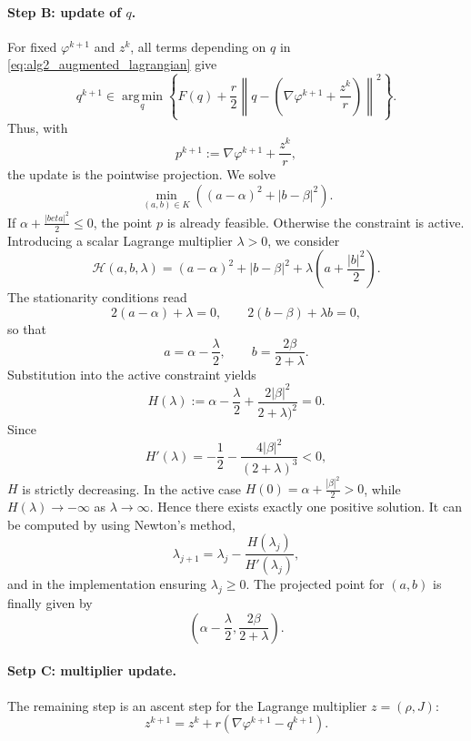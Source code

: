 \paragraph{Step B: update of $q$.}
For fixed $\varphi^{k+1}$ and $z^k$, all terms depending on $q$ in \eqref{eq:alg2_augmented_lagrangian} give
$$
q^{k+1}\in\operatorname*{arg\,\min}_q\left\{F(q)+\frac r2\left\|q-\left(\nabla\varphi^{k+1}+\frac{z^k}{r}\right)\right\|^2\right\}.
$$
Thus, with
$$
p^{k+1}:=\nabla\varphi^{k+1}+\frac{z^k}{r},
$$
the update is the pointwise projection. We solve
\begin{equation*}
	\min_{(a,b)\in K}\left((a-\alpha)^2+|b-\beta|^2\right).
\end{equation*}
If $\alpha +\frac{|beta|^2}{2}\leq0$, the point $p$ is already feasible. Otherwise the constraint is active. Introducing a scalar Lagrange multiplier $\lambda>0$, we consider
$$
\mathcal{H}(a,b,\lambda) = (a-\alpha)^2+|b-\beta|^2+\lambda\left(a+\frac{|b|^2}{2}\right).
$$
The stationarity conditions read
$$
2(a-\alpha)+\lambda=0,\qquad 2(b-\beta)+\lambda b=0,
$$
so that 
$$
a=\alpha-\frac{\lambda}{2},\qquad b=\frac{2\beta}{2+\lambda}.
$$
Substitution into the active constraint yields
\begin{equation*}
	H(\lambda) := \alpha-\frac\lambda2+\frac{2|\beta|^2}{2+\lambda)^2}=0.
\end{equation*}
Since 
$$
H'(\lambda) = -\frac12-\frac{4|\beta|^2}{(2+\lambda)^3}<0,
$$
$H$ is strictly decreasing. In the active case $H(0) = \alpha+\frac{|\beta|^2}{2}>0$, while $H(\lambda)\to-\infty$ as $\lambda\to\infty$. Hence there exists exactly one positive solution. It can be computed by using Newton's method,
$$
\lambda_{j+1}=\lambda_j-\frac{H(\lambda_j)}{H'(\lambda_j)},
$$
and in the implementation ensuring $\lambda_j\geq 0$. The projected point for $(a,b)$ is finally given by
$$
\left(\alpha-\frac\lambda2,\frac{2\beta}{2+\lambda}\right).
$$

\paragraph{Setp C: multiplier update.}
The remaining step is an ascent step for the Lagrange multiplier $z= (\rho,J)$:
\begin{equation*}
	z^{k+1}=z^k+r\left(\nabla\varphi^{k+1}-q^{k+1}\right).
\end{equation*}

